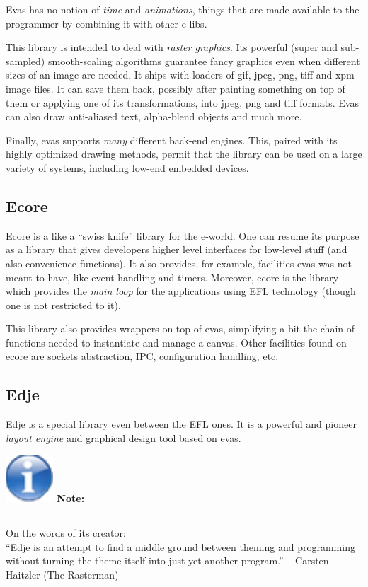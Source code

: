 \documentclass[a4paper]{profusion}
\newenvironment{myboxenv}[1]
  {
    \begin{flushright}
      \begin{boxedminipage}{0.9\textwidth}
        \textbf{%
          \large #1:}

        \hspace{-5pt}\rule{0.3\textwidth}{0.5pt}
        \begin{center}
          \begin{minipage}{0.95\textwidth}

            \small%
         }
          {
          \end{minipage}
        \end{center}
      \end{boxedminipage}
    \end{flushright}
 }
\newenvironment{note}
  {
    \begin{myboxenv}{
        \includegraphics[scale=0.4]{images/note.pdf}
        Note}
   }
    {
    \end{myboxenv}
 }
\begin{document}
Evas has no notion of \emph{time} and \emph{animations}, things that
are made available to the programmer by combining it with other
e-libs.

This library is intended to deal with \emph{raster graphics}. Its
powerful (super and sub-sampled) smooth-scaling algorithms guarantee
fancy graphics even when different sizes of an image are needed. It
ships with loaders of gif, jpeg, png, tiff and xpm image files. It can
save them back, possibly after painting something on top of them or
applying one of its transformations, into jpeg, png and tiff formats.
Evas can also draw anti-aliased text, alpha-blend objects and much
more.

Finally, evas supports \emph{many} different back-end engines. This,
paired with its highly optimized drawing methods, permit that the
library can be used on a large variety of systems, including low-end
embedded devices.

\subsection{Ecore}

Ecore is a like a ``swiss knife'' library for the e-world. One can
resume its purpose as a library that gives developers higher level
interfaces for low-level stuff (and also convenience functions). It
also provides, for example, facilities evas was not meant to have,
like event handling and timers.  Moreover, ecore is the library which
provides the \emph{main loop} for the applications using EFL
technology (though one is not restricted to it).

This library also provides wrappers on top of evas, simplifying a bit
the chain of functions needed to instantiate and manage a
canvas. Other facilities found on ecore are sockets abstraction, IPC,
configuration handling, etc.

\subsection{Edje}

Edje is a special library even between the EFL ones. It is a powerful
and pioneer \emph{layout engine} and graphical design tool based on
evas.

\begin{note}
On the words of its creator:\\

``Edje is an attempt to find a middle ground between theming and
programming without turning the theme itself into just yet another
program.'' -- Carsten Haitzler (The Rasterman)
\end{note}
\end{document}
